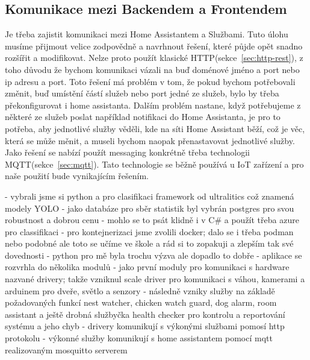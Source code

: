 \subsection{Komunikace mezi Backendem a Frontendem}\label{subsec:komunikace-mezi-backendem-a-frontendem}
Je třeba zajistit komunikaci mezi Home Assistantem a Službami.
Tuto úlohu musíme přijmout velice zodpovědně a navrhnout řešení, které půjde opět snadno rozšířit a modifikovat.
Nelze proto použít klasické HTTP(sekce~\ref{sec:http-rest}), z toho důvodu že bychom komunikaci vázali na buď doménové jméno a port nebo ip adresu a port.
Toto řešení má problém v tom, že pokud bychom potřebovali změnit, buď umístění částí služeb nebo port jedné ze služeb, bylo by třeba překonfigurovat i home assistanta.
Dalším problém nastane, když potřebujeme z některé ze služeb poslat například notifikaci do Home Assistanta, je pro to potřeba, aby jednotlivé služby věděli, kde na síti Home Assistant běží, což je věc, která se může měnit, a museli bychom naopak přenastavovat jednotlivé služby.
Jako řešení se nabízí použít messaging konkrétně třeba technologii MQTT(sekce~\ref{sec:mqtt}).
Tato technologie se běžně používá u IoT zařízení a pro naše použití bude vynikajícím řešením.

- vybrali jsme si python a pro clasifikaci framework od ultralitics což znamená modely YOLO\newline
- jako databáze pro sběr statistik byl vybrán postgres pro svou robustnost a dobrou cenu\newline
- mohlo se to psát klidně i v C\# a použít třeba azure pro classifikaci\newline
- pro kontejnerizaci jsme zvolili docker; dalo se i třeba podman nebo podobné ale toto se učíme ve škole a rád si to zopakuji a zlepším tak své dovednosti\newline
- python pro mě byla trochu výzva ale dopadlo to dobře
- aplikace se rozvrhla do několika modulů\newline
- jako první moduly pro komunikaci s hardware nazvané drivery; takže vzniknul scale driver pro komunikaci s váhou, kamerami a arduinem pro dveře, světlo a senzory\newline
- následně vzniky služby na základě požadovaných funkcí nest watcher, chicken watch guard, dog alarm, room assistant a ještě drobná službyčka health checker pro kontrolu a reportování systému a jeho chyb\newline
- drivery komunikují s výkonými službami pomosí http protokolu \newline
- výkonné služby komunikují s home assistantem pomocí mqtt realizovaným mosquitto serverem

